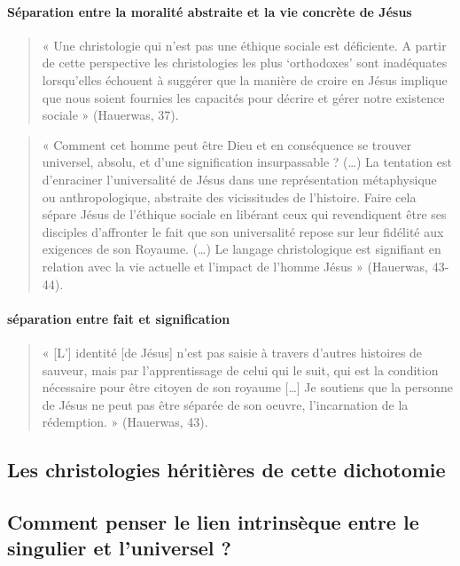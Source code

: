  \paragraph{Séparation entre la moralité abstraite et la vie concrète de Jésus}

\begin{quote}
    « Une christologie qui n’est pas une éthique sociale est déficiente. A partir de cette perspective les
christologies les plus ‘orthodoxes’ sont inadéquates lorsqu’elles échouent à suggérer que la manière de
croire en Jésus implique que nous soient fournies les capacités pour décrire et gérer notre existence
sociale » (Hauerwas, 37).
\end{quote}

\begin{quote}
    « Comment cet homme peut être Dieu et en conséquence se trouver universel, absolu, et d’une
signification insurpassable ? (…) La tentation est d’enraciner l’universalité de Jésus dans une
représentation métaphysique ou anthropologique, abstraite des vicissitudes de l’histoire. Faire cela
sépare Jésus de l’éthique sociale en libérant ceux qui revendiquent être ses disciples d’affronter le fait
que son universalité repose sur leur fidélité aux exigences de son Royaume. (…) Le langage
christologique est signifiant en relation avec la vie actuelle et l’impact de l’homme Jésus » (Hauerwas,
43-44).
\end{quote}
  
 \paragraph{séparation entre fait et signification}


 
\begin{quote}
    « [L’] identité [de Jésus] n’est pas saisie à travers d’autres histoires de sauveur, mais par
l’apprentissage de celui qui le suit, qui est la condition nécessaire pour être citoyen de son
royaume […] Je soutiens que la personne de Jésus ne peut pas être séparée de son oeuvre, l’incarnation
de la rédemption. » (Hauerwas, 43).
\end{quote}
 \subsection{Les christologies héritières de cette dichotomie}
 
  \subsection{Comment penser le lien intrinsèque entre le singulier et l’universel ?}

